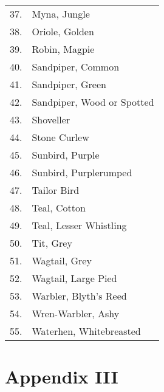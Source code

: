 \begin{longtable}{cl}
37.& Myna, Jungle \\
38.& Oriole, Golden \\
39.& Robin, Magpie \\
40.& Sandpiper, Common \\
41.& Sandpiper, Green \\
42.& Sandpiper, Wood or Spotted \\
43. &Shoveller \\
44. &Stone Curlew\\ 
45. &Sunbird, Purple \\
46. &Sunbird, Purplerumped \\
47. & Tailor Bird \\
48. & Teal, Cotton \\
49. & Teal, Lesser Whistling \\
50.& Tit, Grey \\
51.& Wagtail, Grey \\
52.& Wagtail, Large Pied \\
53.& Warbler, Blyth's Reed \\
54.& Wren-Warbler, Ashy \\
55.& Waterhen, Whitebreasted 
\end{longtable}

\newpage

\chapter*{Appendix III}

